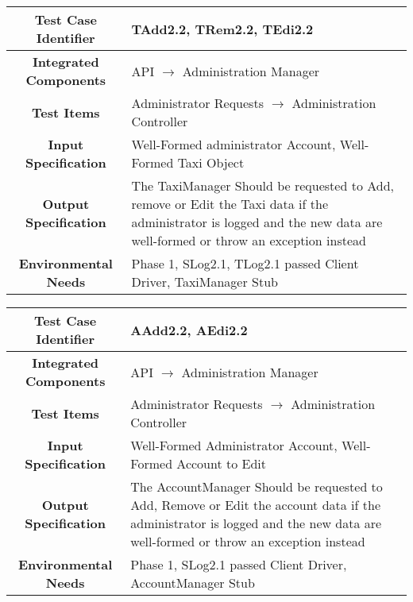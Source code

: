 \documentclass[11pt, a4paper,titlepage]{article}
\begin{document}
	 
	 	\begin{tabularx}{\textwidth}{| c|X|}
	 		\hline \textbf{Test Case Identifier} & \label{TAdd2.2}TAdd2.2, \label{TRem2.2}TRem2.2, \label{TEdi2.2}TEdi2.2 \\
	 		\hline \textbf{Integrated Components} &  API $\rightarrow $ Administration Manager \\
	 		\hline \textbf{Test Items} &  Administrator Requests  $\rightarrow $ Administration Controller\\
	 		\hline \textbf{Input Specification} &  Well-Formed administrator Account, Well-Formed Taxi Object \\
	 		\hline \textbf{Output Specification} & The TaxiManager Should be requested to Add, remove or Edit the Taxi data if the administrator is logged and the new data are well-formed or throw an exception instead\\
	 		\hline \textbf{Environmental Needs} &  Phase 1, SLog2.1, TLog2.1 passed \newline 
	 		Client Driver, TaxiManager Stub\\
	 		\hline
	 	\end{tabularx}
	 	\newline
		 \begin{tabularx}{\textwidth}{| c|X|}
		 	\hline \textbf{Test Case Identifier} & \label{AAdd2.2}AAdd2.2, \label{AEdi2.2}AEdi2.2 \\
		 	\hline \textbf{Integrated Components} &  API $\rightarrow $ Administration Manager \\
		 	\hline \textbf{Test Items} &  Administrator Requests  $\rightarrow $ Administration Controller\\
		 	\hline \textbf{Input Specification} &  Well-Formed Administrator Account, Well-Formed Account to Edit \\
		 	\hline \textbf{Output Specification} & The AccountManager Should be requested to Add, Remove or Edit the account data if the administrator is logged and the new data are well-formed or throw an exception instead\\
		 	\hline \textbf{Environmental Needs} &  Phase 1, SLog2.1 passed \newline 
		 	Client Driver, AccountManager Stub\\
		 	\hline
		 \end{tabularx}
		 \newline
		 
\end{document}
